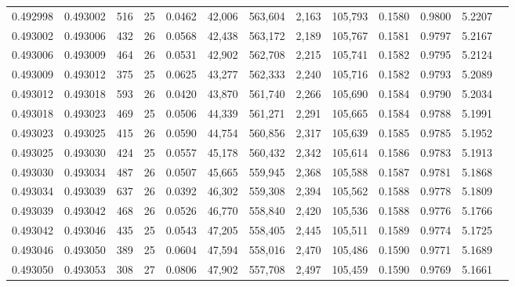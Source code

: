 \begin{tabular}{rrrrrrrrrrrrr}
0.492998 & 0.493002 & 516 &  25 &                                     0.0462 &  42,006 & 563,604 &   2,163 & 105,793 & 0.1580 & 0.9800 & 5.2207 \\
0.493002 & 0.493006 & 432 &  26 &                                     0.0568 &  42,438 & 563,172 &   2,189 & 105,767 & 0.1581 & 0.9797 & 5.2167 \\
0.493006 & 0.493009 & 464 &  26 &                                     0.0531 &  42,902 & 562,708 &   2,215 & 105,741 & 0.1582 & 0.9795 & 5.2124 \\
0.493009 & 0.493012 & 375 &  25 &                                     0.0625 &  43,277 & 562,333 &   2,240 & 105,716 & 0.1582 & 0.9793 & 5.2089 \\
0.493012 & 0.493018 & 593 &  26 &                                     0.0420 &  43,870 & 561,740 &   2,266 & 105,690 & 0.1584 & 0.9790 & 5.2034 \\
0.493018 & 0.493023 & 469 &  25 &                                     0.0506 &  44,339 & 561,271 &   2,291 & 105,665 & 0.1584 & 0.9788 & 5.1991 \\
0.493023 & 0.493025 & 415 &  26 &                                     0.0590 &  44,754 & 560,856 &   2,317 & 105,639 & 0.1585 & 0.9785 & 5.1952 \\
0.493025 & 0.493030 & 424 &  25 &                                     0.0557 &  45,178 & 560,432 &   2,342 & 105,614 & 0.1586 & 0.9783 & 5.1913 \\
0.493030 & 0.493034 & 487 &  26 &                                     0.0507 &  45,665 & 559,945 &   2,368 & 105,588 & 0.1587 & 0.9781 & 5.1868 \\
0.493034 & 0.493039 & 637 &  26 &                                     0.0392 &  46,302 & 559,308 &   2,394 & 105,562 & 0.1588 & 0.9778 & 5.1809 \\
0.493039 & 0.493042 & 468 &  26 &                                     0.0526 &  46,770 & 558,840 &   2,420 & 105,536 & 0.1588 & 0.9776 & 5.1766 \\
0.493042 & 0.493046 & 435 &  25 &                                     0.0543 &  47,205 & 558,405 &   2,445 & 105,511 & 0.1589 & 0.9774 & 5.1725 \\
0.493046 & 0.493050 & 389 &  25 &                                     0.0604 &  47,594 & 558,016 &   2,470 & 105,486 & 0.1590 & 0.9771 & 5.1689 \\
0.493050 & 0.493053 & 308 &  27 &                                     0.0806 &  47,902 & 557,708 &   2,497 & 105,459 & 0.1590 & 0.9769 & 5.1661 \\

\end{tabular}
